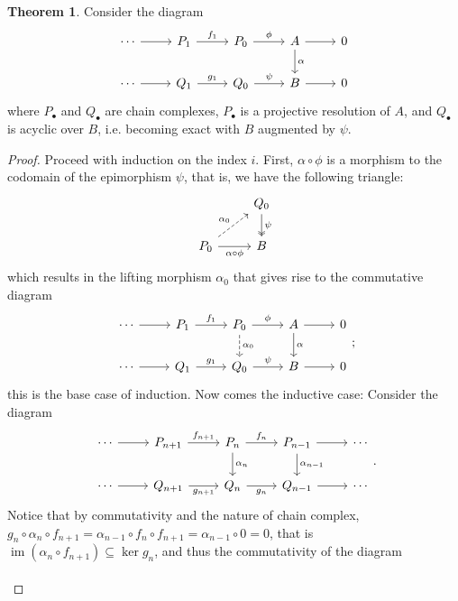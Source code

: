 \documentclass[10pt]{report}
\theoremstyle{definition}
\newtheorem{theorem}{Theorem}
\begin{document}
\begin{theorem}
Consider the diagram
$$
\begin{tikzcd}
\cdots \arrow[r] & P_1 \arrow[r, "f_1"] & P_0 \arrow[r, "\phi"] & A \arrow[r] \arrow[d, "\alpha"] & 0 \\
\cdots \arrow[r] & Q_1 \arrow[r, "g_1"] & Q_0 \arrow[r, "\psi"] & B \arrow[r]                     & 0
\end{tikzcd}
$$
where $P_\bullet$ and $Q_\bullet$ are chain complexes, $P_\bullet$ is a projective resolution of $A$, and $Q_\bullet$ is acyclic over $B$, i.e. becoming exact with $B$ augmented by $\psi$.
\end{theorem}
\begin{proof}
Proceed with induction on the index $i$. First, $\alpha\circ\phi$ is a morphism to the codomain of the epimorphism $\psi$, that is, we have the following triangle:
$$
\begin{tikzcd}
                                                                 & Q_0 \arrow[d, "\psi", two heads] \\
P_0 \arrow[r, "\alpha\circ\phi"'] \arrow[ru, "\alpha_0", dashed] & B
\end{tikzcd}
$$
which results in the lifting morphism $\alpha_0$ that gives rise to the commutative diagram
$$
\begin{tikzcd}
\cdots \arrow[r] & P_1 \arrow[r, "f_1"] & P_0 \arrow[r, "\phi"] \arrow[d, "\alpha_0", dashed] & A \arrow[r] \arrow[d, "\alpha"] & 0 \\
\cdots \arrow[r] & Q_1 \arrow[r, "g_1"] & Q_0 \arrow[r, "\psi"]                               & B \arrow[r]                     & 0
\end{tikzcd};
$$
this is the base case of induction.
Now comes the inductive case: Consider the diagram
$$
\begin{tikzcd}
\cdots \arrow[r] & P_{n+1} \arrow[r, "f_{n+1}"]  & P_n \arrow[d, "\alpha_n"] \arrow[r, "f_n"] & P_{n-1} \arrow[r] \arrow[d, "\alpha_{n-1}"] & \cdots \\
\cdots \arrow[r] & Q_{n+1} \arrow[r, "g_{n+1}"'] & Q_n \arrow[r, "g_n"']                      & Q_{n-1} \arrow[r]                           & \cdots
\end{tikzcd}.
$$
Notice that by commutativity and the nature of chain complex, $g_n\circ\alpha_n\circ f_{n+1}=\alpha_{n-1}\circ f_n\circ f_{n+1}=\alpha_{n-1}\circ0=0$, that is $\operatorname{im}(\alpha_n\circ f_{n+1})\subseteq\ker g_n$, and thus the commutativity of the diagram
$$
\begin{tikzcd}

\end{tikzcd}$$
\end{proof}
\end{document}
